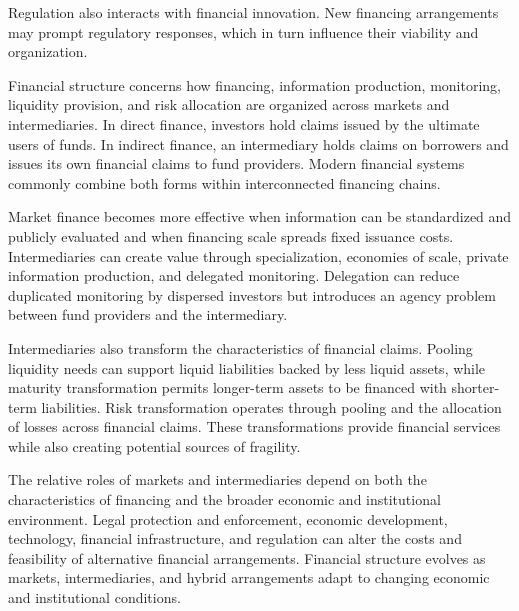 Regulation also interacts with financial innovation. New financing arrangements may prompt regulatory responses, which in turn influence their viability and organization.



Financial structure concerns how financing, information production, monitoring, liquidity provision, and risk allocation are organized across markets and intermediaries. In direct finance, investors hold claims issued by the ultimate users of funds. In indirect finance, an intermediary holds claims on borrowers and issues its own financial claims to fund providers. Modern financial systems commonly combine both forms within interconnected financing chains.

Market finance becomes more effective when information can be standardized and publicly evaluated and when financing scale spreads fixed issuance costs. Intermediaries can create value through specialization, economies of scale, private information production, and delegated monitoring. Delegation can reduce duplicated monitoring by dispersed investors but introduces an agency problem between fund providers and the intermediary.

Intermediaries also transform the characteristics of financial claims. Pooling liquidity needs can support liquid liabilities backed by less liquid assets, while maturity transformation permits longer-term assets to be financed with shorter-term liabilities. Risk transformation operates through pooling and the allocation of losses across financial claims. These transformations provide financial services while also creating potential sources of fragility.

The relative roles of markets and intermediaries depend on both the characteristics of financing and the broader economic and institutional environment. Legal protection and enforcement, economic development, technology, financial infrastructure, and regulation can alter the costs and feasibility of alternative financial arrangements. Financial structure evolves as markets, intermediaries, and hybrid arrangements adapt to changing economic and institutional conditions.


